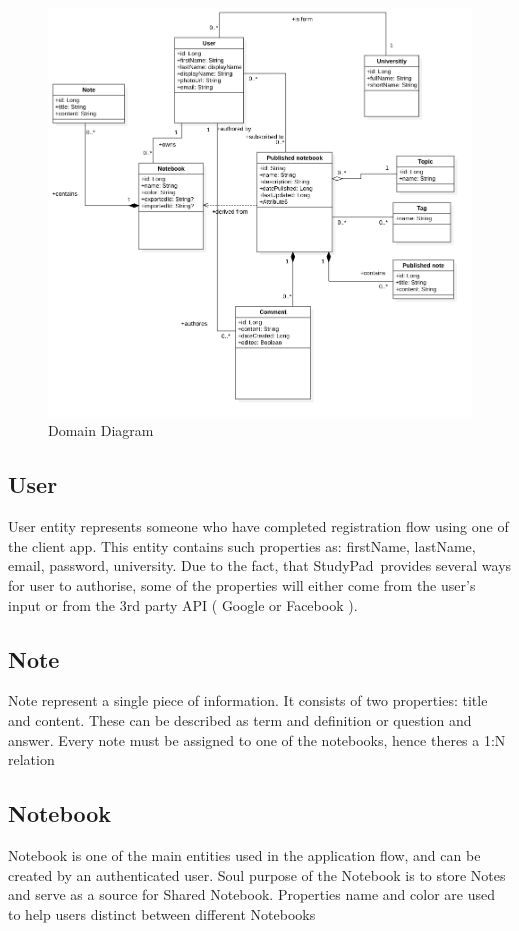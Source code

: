 \documentclass[thesis=B,english]{FITthesis}[2012/10/20]
\newcommand{\appname}{StudyPad}
\begin{document}
\begin{figure}[H]
  \includegraphics[width=\linewidth]{Domain}
  \caption{Domain Diagram}
  \label{fig:domain}
\end{figure}

 

\subsection{User}
	User entity represents someone who have completed registration flow using one of the client app. This entity contains such properties as: firstName, lastName, email, password, university. Due to the fact, that \appname\ provides several ways for user to authorise, some of the properties will either come from the user's input or from the 3rd party API ( Google or Facebook ).

	
\subsection{Note}
	Note represent a single piece of information. It consists of two properties: title and content. These can be described as term and definition or question and answer. Every note must be assigned to one of the notebooks, hence theres a 1:N relation
\subsection{Notebook}
	Notebook is one of the main entities used in the application flow, and  can be created by an authenticated user. Soul purpose of the Notebook is to store Notes and serve as a source for Shared Notebook. Properties name and color are used to help users distinct between different Notebooks
	
\end{document}

